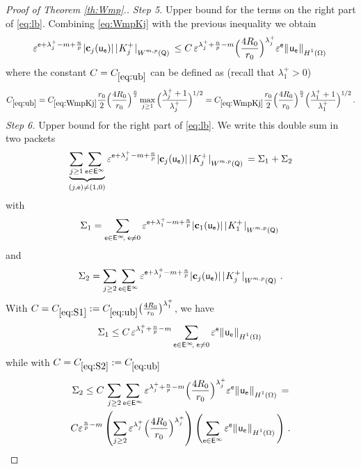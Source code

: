 \documentclass[titlepage,12pt]{amsart}
\theoremstyle{definition}
\theoremstyle{remark}
\numberwithin{equation}{section}
\newcommand{\ee}{\hskip0.15ex}
\newcommand{\dd}[1]{_{\raise-0.6ex\hbox{$\scriptstyle #1$}}}
\newcommand {\Norm}[2]{ \mathchoice
    {|\ee #1\ee|\dd{#2}\,}
    {| #1 |_{#2}}
    {| #1 |_{#2}}
    {| #1 |_{#2}} }
\newcommand {\DNorm}[2]{ \mathchoice
    {\|\ee #1\ee\|\dd{#2}\,}
    {\| #1 \|_{#2}}
    {\| #1 \|_{#2}}
    {\| #1 \|_{#2}} }
\newcommand{\rQ}{{\mathsf{Q}}}
\newcommand{\sfe}{{\mathsf e}}
\newcommand{\sfE}{{\mathsf E}}
\newcommand{\sfu}{{\mathsf u}}
\begin{document}
\begin{proof}[Proof of Theorem \ref{th:Wmp}.]
{\em Step 5.} Upper bound for the terms on the right part of \eqref{eq:lb}. Combining \eqref{eq:WmpKj} with the previous inequality we obtain
\begin{equation}
\label{eq:ub}
   \varepsilon^{\sfe+\lambda^+_j-m+\frac{n}{p}} 
   |\mathbf{c}_j(\sfu_\sfe)|\, 
   \Norm{K^+_j}{W^{m,p}(\rQ)} \le 
   C\,\varepsilon^{\lambda^+_j+\frac{n}{p} - m} 
   \Big(\frac{4R_0}{r_0} \Big)^{\lambda^+_j} 
   \varepsilon^{\sfe} \DNorm{\sfu_\sfe}{H^1(\Omega)} 
\end{equation}
where the constant $C=C_{\eqref{eq:ub}}$ can be defined as (recall that $\lambda^+_1>0$)
\[
   C_{\eqref{eq:ub}} = C_{\eqref{eq:WmpKj}} 
   \frac{r_0}{2}\Big(\frac{4R_0}{r_0} \Big)^{\frac{n}{2}} 
   \max_{j\ge1} \Big(\frac{\lambda^+_j+1}{\lambda^+_j}\Big)^{1/2} =
   C_{\eqref{eq:WmpKj}} 
   \frac{r_0}{2}\Big(\frac{4R_0}{r_0} \Big)^{\frac{n}{2}}
   \Big(\frac{\lambda^+_1+1}{\lambda^+_1}\Big)^{1/2} \,.
\]
{\em Step 6.} Upper bound for the right part of \eqref{eq:lb}. We write this double sum in two packets
\[
   \underbrace{\sum_{j\ge 1} \sum_{\sfe\in\sfE^\infty}}_{(j,\sfe)\neq(1,0)} 
   \varepsilon^{\sfe+\lambda^+_j-m+\frac{n}{p}} 
   |\mathbf{c}_j(\sfu_\sfe)|\, 
   \Norm{K^+_j}{W^{m,p}(\rQ)}
  = \Sigma_1 + \Sigma_2   
\]
with
\[
   \Sigma_1 =   \sum_{\sfe\in\sfE^\infty\!,\;\sfe\neq0} \varepsilon^{\sfe+\lambda^+_1-m+\frac{n}{p}} 
   |\mathbf{c}_1(\sfu_\sfe)|\, 
   \Norm{K^+_1}{W^{m,p}(\rQ)}
\]
and
\[
   \Sigma_2 =    \sum_{j\ge2} \sum_{\sfe\in\sfE^\infty} \varepsilon^{\sfe+\lambda^+_j-m+\frac{n}{p}} 
   |\mathbf{c}_j(\sfu_\sfe)|\, 
   \Norm{K^+_j}{W^{m,p}(\rQ)}\,.
\]
With $C=C_{\eqref{eq:S1}} := C_{\eqref{eq:ub}} \big(\frac{4R_0}{r_0} \big)^{\lambda^+_1}$, we have
\begin{equation}
\label{eq:S1}
   \Sigma_1 \le C \, \varepsilon^{\lambda^+_1+\frac{n}{p} - m} 
   \sum_{\sfe\in\sfE^\infty\!,\;\sfe\neq0} \varepsilon^{\sfe} \DNorm{\sfu_\sfe}{H^1(\Omega)}
\end{equation}
while with $C=C_{\eqref{eq:S2}} := C_{\eqref{eq:ub}}$
\begin{multline}
\label{eq:S2}
   \Sigma_2 \le C \, \sum_{j\ge2} \sum_{\sfe\in\sfE^\infty} 
   \varepsilon^{\lambda^+_j+\frac{n}{p} - m} 
   \Big(\frac{4R_0}{r_0} \Big)^{\lambda^+_j} 
   \varepsilon^{\sfe} \DNorm{\sfu_\sfe}{H^1(\Omega)} = \\
   C \varepsilon^{\frac{n}{p} - m}
   \left( \sum_{j\ge2}    \varepsilon^{\lambda^+_j} 
   \Big(\frac{4R_0}{r_0} \Big)^{\lambda^+_j} \right)
   \left( \sum_{\sfe\in\sfE^\infty} \varepsilon^{\sfe} \DNorm{\sfu_\sfe}{H^1(\Omega)}\right)\,.
\end{multline}


\end{proof}
\end{document}
